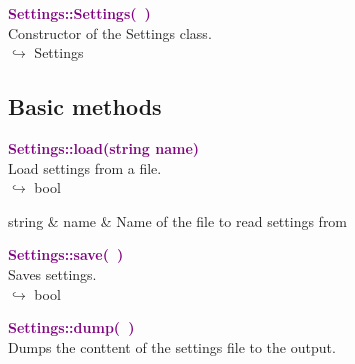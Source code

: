 \textcolor{purple}{\textbf{Settings::Settings(~)}}\label{Settings::Settings()}\\
Constructor of the Settings class.\\ \hspace*{10mm}$\hookrightarrow$ Settings


\subsection{Basic methods}

\textcolor{purple}{\textbf{Settings::load(string name)}}\label{Settings::load(string name)}\\
Load settings from a file.\\ \hspace*{10mm}$\hookrightarrow$ bool

\begin{tcolorbox}[width=\textwidth,myArgs,tabularx={ll|R}]
string & name & Name of the file to read settings from
\end{tcolorbox}


\textcolor{purple}{\textbf{Settings::save(~)}}\label{Settings::save()}\\
Saves settings.\\ \hspace*{10mm}$\hookrightarrow$ bool


\textcolor{purple}{\textbf{Settings::dump(~)}}\label{Settings::dump()}\\
Dumps the conttent of the settings file to the output.

